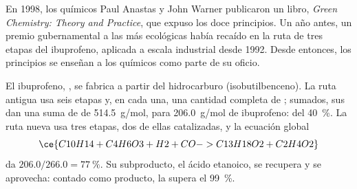 \begin{history}
En 1998, los químicos Paul Anastas y John Warner publicaron un libro,
\emph{Green Chemistry: Theory and Practice}, que expuso los doce
principios. Un año antes, un premio gubernamental a las  más
ecológicas había recaído en la ruta de tres etapas del ibuprofeno,
aplicada a escala industrial desde 1992. Desde entonces, los principios
se enseñan a los químicos como parte de su oficio.
\end{history}

\begin{example}\label{ex:g12:synthesis-strategy:ibuprofen}
El ibuprofeno, , se fabrica a partir del hidrocarburo
 (isobutilbenceno). La ruta antigua usa seis etapas y, en
cada una, una cantidad completa de ; sumados, sus  dan
una suma de  de \qty{514.5}{g/mol}, para \qty{206.0}{g/mol}
de ibuprofeno:  del \qty{40}{\percent}. La ruta nueva usa
tres etapas, dos de ellas catalizadas, y la ecuación global
\[
  \ce{C10H14 + C4H6O3 + H2 + CO -> C13H18O2 + C2H4O2}
\]
da $206.0/266.0 = \qty{77}{\percent}$. Su subproducto, el ácido
etanoico, se recupera y se aprovecha: contado como producto, la  supera el \qty{99}{\percent}.
\end{example}

